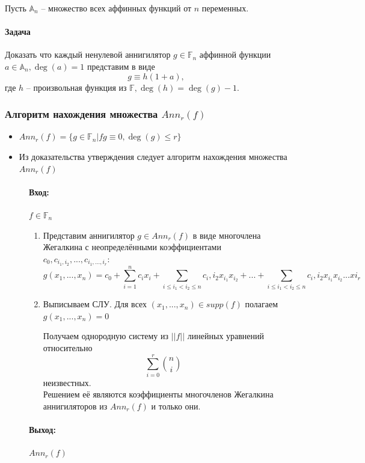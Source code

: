 \documentclass[a4paper,12pt]{article}
\begin{document}
Пусть $\mathbb{A}_n$ -- множество всех аффинных функций от $n$
переменных.

\paragraph{Задача} Доказать что каждый ненулевой аннигилятор
$g \in \mathbb{F}_n$ аффинной функции $a \in \mathbb{A}_n,
\deg(a) = 1$ представим в виде \[ g \equiv h(1 + a), \] где $h$
-- произвольная функция из $\mathbb{F}, \deg(h) = \deg(g) - 1$.

\subsubsection{Алгоритм нахождения множества $Ann_r(f)$}
\begin{itemize}
    \item $Ann_r(f) = \{ g \in \mathbb{F}_n | fg \equiv 0,
    \deg(g) \leq r \}$
    \item Из доказательства утверждения следует алгоритм
    нахождения множества $Ann_r(f)$
\end{itemize}

\begin{figure}
\paragraph{Вход:} $f \in \mathbb{F}_n$

\begin{enumerate}
    \item Представим аннигилятор $g \in Ann_r(f)$ в виде
    многочлена Жегалкина с неопределёнными коэффициентами
    $c_0, c_{i_1,i_2}, ..., c_{i_1,..., i_r}$:
    \[ g(x_1, ..., x_n) = c_0 + \sum_{i=1}^n c_ix_i + \sum_{i
        \leq i_1 < i_2 \leq n} c_i, i_2 x_{i_1} x_{i_2} +
        ... + \sum_{i
        \leq i_1 < i_2 \leq n} c_i, i_2 x_{i_1} x_{i_2}
        ... x{i_r} \]
    \item Выписываем СЛУ. Для всех $(x_1, ..., x_n) \in supp(f)$
    полагаем $g(x_1, ..., x_n) = 0$

    Получаем однородную систему из $||f||$ линейных уравнений
    относительно \[ \sum_{i=0}^r \binom{n}{i} \]
    неизвестных.\\
    Решением её являются коэффициенты многочленов Жегалкина
    аннигиляторов из $Ann_r(f)$ и только они.
\end{enumerate}
\paragraph{Выход:} $Ann_r(f)$
\end{figure}
\end{document}
